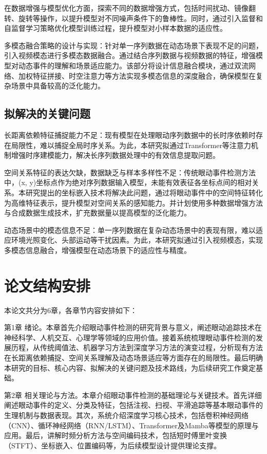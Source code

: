 \documentclass{xdupgthesis}
\begin{document}
在数据增强与模型优化方面，探索不同的数据增强方式，包括时间扰动、镜像翻转、旋转等操作，以提升模型对不同噪声条件下的鲁棒性。同时，通过引入监督和自监督学习策略优化模型训练过程，提升模型对小样本数据的适应性。

多模态融合策略的设计与实现：针对单一序列数据在动态场景下表现不足的问题，引入视频模态进行多模态数据融合。通过结合序列数据与视频数据的特征，增强模型对动态事件的理解和场景适应能力。该部分将设计信息融合模块，通过双流网络、加权特征拼接、时空注意力等方法实现多模态信息的深度融合，确保模型在复杂场景中具备较高的泛化能力。

\subsection{拟解决的关键问题}

长距离依赖特征捕捉能力不足：现有模型在处理眼动序列数据中的长时序依赖时存在局限性，难以捕捉全局时序关系。为此，本研究拟通过Transformer等注意力机制增强时序建模能力，解决长序列数据处理中的有效信息提取问题。

空间关系特征的表达欠缺，数据缺乏与样本多样性不足：传统眼动事件检测方法中，(x, y)坐标点作为绝对序列数据输入模型，未能有效表征各坐标点间的相对关系。本研究提出的坐标嵌入技术将解决此问题，通过将眼动事件中的空间特征转化为高维特征表示，提升模型对空间关系的感知能力。并计划使用多种数据增强方法与合成数据生成技术，扩充数据量以提高模型的泛化能力。

动态场景中的模态信息不足：单一序列数据在复杂动态场景中的表现有限，难以适应环境光照变化、头部运动等干扰因素。为此，本研究拟通过引入视频模态，实现多模态信息融合，增强模型在动态场景下的适应性与精度。

\section{论文结构安排}

本论文共分为6章，各章节内容安排如下：

第1章 绪论。本章首先介绍眼动事件检测的研究背景与意义，阐述眼动追踪技术在神经科学、人机交互、心理学等领域的应用价值。接着系统梳理眼动事件检测的发展历程，从传统阈值法、机器学习方法到深度学习方法的演变过程，分析现有方法在长距离依赖捕捉、空间关系理解及动态场景适应等方面存在的局限性。最后明确本研究的目标、核心内容、拟解决的关键问题及技术路线，为后续研究工作奠定基础。

第2章 相关理论与方法。本章介绍眼动事件检测的基础理论与关键技术。首先详细阐述眼动事件的定义、分类及特征，包括注视、扫视、平滑追踪等基本眼动事件的生理机制与数据表现。其次，系统介绍深度学习核心技术，包括卷积神经网络（CNN）、循环神经网络（RNN/LSTM）、Transformer及Mamba等模型的原理与应用。最后，讲解时频分析方法与空间编码技术，包括短时傅里叶变换（STFT）、坐标嵌入、位置编码等，为后续模型设计提供理论支撑。
\end{document}
